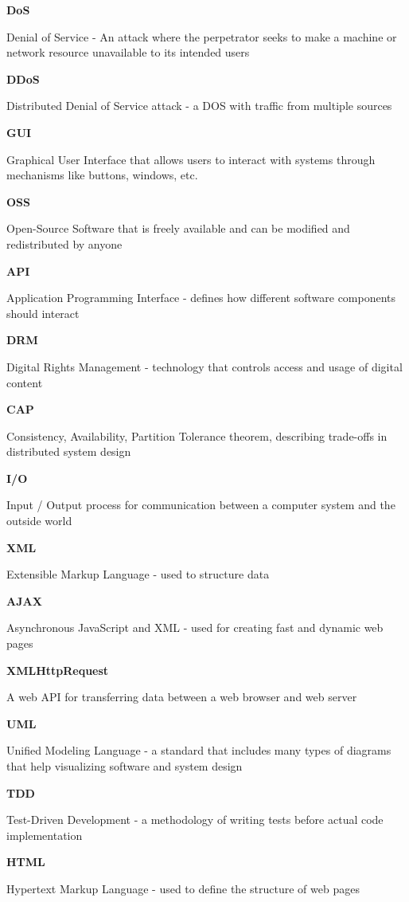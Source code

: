 \documentclass[]{final}
\begin{document}
\textbf{DoS}

Denial of Service - An attack where the perpetrator seeks to make a machine or network resource unavailable
to its intended users

\textbf{DDoS}

Distributed Denial of Service attack - a DOS with traffic from multiple sources

\textbf{GUI}

Graphical User Interface that allows users to interact with systems through mechanisms like buttons, windows, etc.

\textbf{OSS}

Open-Source Software that is freely available and can be modified and redistributed by anyone

\textbf{API}

Application Programming Interface - defines how different software components should interact

\textbf{DRM}

Digital Rights Management - technology that controls access and usage of digital content

\textbf{CAP}

Consistency, Availability, Partition Tolerance theorem, describing trade-offs in distributed system design

\textbf{I/O}

Input / Output process for communication between a computer system and the outside world

\textbf{XML}

Extensible Markup Language - used to structure data

\textbf{AJAX}

Asynchronous JavaScript and XML - used for creating fast and dynamic web pages

\textbf{XMLHttpRequest}

A web API for transferring data between a web browser and web server

\textbf{UML}

Unified Modeling Language - a standard that includes many types of diagrams that help visualizing software and system design

\textbf{TDD}

Test-Driven Development - a methodology of writing tests before actual code implementation

\textbf{HTML}

Hypertext Markup Language - used to define the structure of web pages
\end{document}
